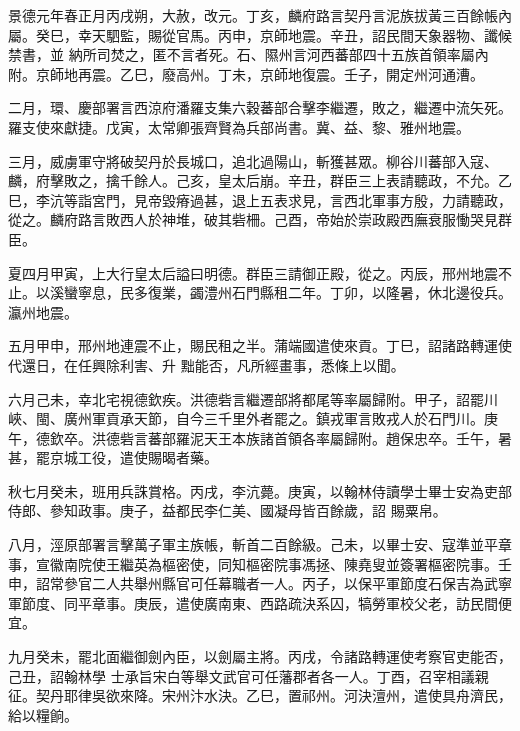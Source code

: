 \begin{pinyinscope}
 景德元年春正月丙戌朔，大赦，改元。丁亥，麟府路言契丹言泥族拔黃三百餘帳內屬。癸巳，幸天駟監，賜從官馬。丙申，京師地震。辛丑，詔民間天象器物、讖候禁書，並
 納所司焚之，匿不言者死。石、隰州言河西蕃部四十五族首領率屬內附。京師地再震。乙巳，廢高州。丁未，京師地復震。壬子，開定州河通漕。



 二月，環、慶部署言西涼府潘羅支集六穀蕃部合擊李繼遷，敗之，繼遷中流矢死。羅支使來獻捷。戊寅，太常卿張齊賢為兵部尚書。冀、益、黎、雅州地震。



 三月，威虜軍守將破契丹於長城口，追北過陽山，斬獲甚眾。柳谷川蕃部入寇、麟，府擊敗之，擒千餘人。己亥，皇太后崩。辛丑，群臣三上表請聽政，不允。乙
 巳，李沆等詣宮門，見帝毀瘠過甚，退上五表求見，言西北軍事方殷，力請聽政，從之。麟府路言敗西人於神堆，破其砦柵。己酉，帝始於崇政殿西廡衰服慟哭見群臣。



 夏四月甲寅，上大行皇太后謚曰明德。群臣三請御正殿，從之。丙辰，邢州地震不止。以溪蠻寧息，民多復業，蠲澧州石門縣租二年。丁卯，以隆暑，休北邊役兵。瀛州地震。



 五月甲申，邢州地連震不止，賜民租之半。蒲端國遣使來貢。丁巳，詔諸路轉運使代還日，在任興除利害、升
 黜能否，凡所經畫事，悉條上以聞。



 六月己未，幸北宅視德欽疾。洪德砦言繼遷部將都尾等率屬歸附。甲子，詔罷川峽、閩、廣州軍貢承天節，自今三千里外者罷之。鎮戎軍言敗戎人於石門川。庚午，德欽卒。洪德砦言蕃部羅泥天王本族諸首領各率屬歸附。趙保忠卒。壬午，暑甚，罷京城工役，遣使賜暍者藥。



 秋七月癸未，班用兵誅賞格。丙戌，李沆薨。庚寅，以翰林侍讀學士畢士安為吏部侍郎、參知政事。庚子，益都民李仁美、國凝母皆百餘歲，詔
 賜粟帛。



 八月，涇原部署言擊萬子軍主族帳，斬首二百餘級。己未，以畢士安、寇準並平章事，宣徽南院使王繼英為樞密使，同知樞密院事馮拯、陳堯叟並簽署樞密院事。壬申，詔常參官二人共舉州縣官可任幕職者一人。丙子，以保平軍節度石保吉為武寧軍節度、同平章事。庚辰，遣使廣南東、西路疏決系囚，犒勞軍校父老，訪民間便宜。



 九月癸未，罷北面繼御劍內臣，以劍屬主將。丙戌，令諸路轉運使考察官吏能否，己丑，詔翰林學
 士承旨宋白等舉文武官可任藩郡者各一人。丁酉，召宰相議親征。契丹耶律吳欲來降。宋州汴水決。乙巳，置祁州。河決澶州，遣使具舟濟民，給以糧餉。




\end{pinyinscope}
